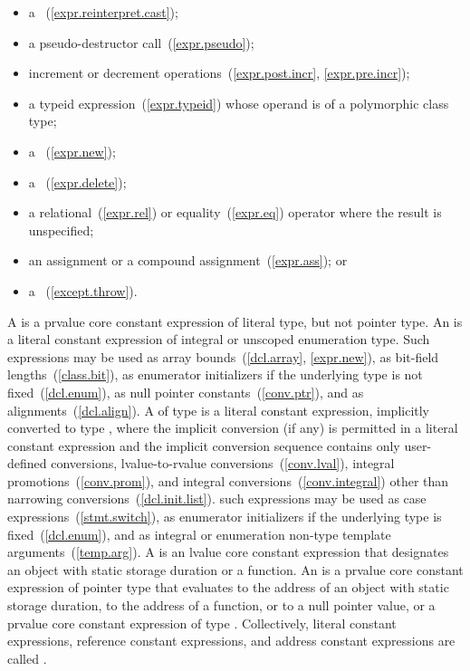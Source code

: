 \begin{itemize}
\item
a ~(\ref{expr.reinterpret.cast});

\item
a pseudo-destructor call~(\ref{expr.pseudo});

\item
increment or decrement operations~(\ref{expr.post.incr}, \ref{expr.pre.incr});

\item
a typeid expression~(\ref{expr.typeid}) whose operand
is of a polymorphic class type;

\item
a ~(\ref{expr.new});

\item
a ~(\ref{expr.delete});

\item
a relational~(\ref{expr.rel}) or equality~(\ref{expr.eq})
operator where the result is unspecified;

\item
an assignment or a compound assignment~(\ref{expr.ass}); or

\item
a ~(\ref{except.throw}).
\end{itemize}

\pnum
A  is a prvalue core constant expression of
literal type, but not pointer type. An  is a
literal constant expression of integral or unscoped enumeration type.
\enternote Such expressions may be
used as array bounds~(\ref{dcl.array}, \ref{expr.new}),
as bit-field lengths~(\ref{class.bit}), as enumerator
initializers if the underlying type is not fixed~(\ref{dcl.enum}),
as null pointer constants~(\ref{conv.ptr}), and as alignments~(\ref{dcl.align}).
\exitnote
A  of type  is a literal constant
expression, implicitly converted to type , where the implicit
conversion (if any) is permitted in a literal constant expression and the
implicit conversion sequence contains only user-defined conversions, lvalue-to-rvalue
conversions~(\ref{conv.lval}), integral promotions~(\ref{conv.prom}), and
integral conversions~(\ref{conv.integral}) other than narrowing conversions~(\ref{dcl.init.list}).
\enternote such expressions may be used as case expressions~(\ref{stmt.switch}),
as enumerator initializers if the underlying type is fixed~(\ref{dcl.enum}), and
as integral or enumeration non-type template arguments~(\ref{temp.arg}). \exitnote
A  is an lvalue core constant expression
that designates an object with static storage duration or a function. An
 is a prvalue core constant expression of
pointer type that evaluates to the address of an object with static storage
duration, to the address of a function, or to a null pointer value, or a prvalue
core constant expression of type . Collectively, literal
constant expressions, reference constant expressions, and address constant
expressions are called .


